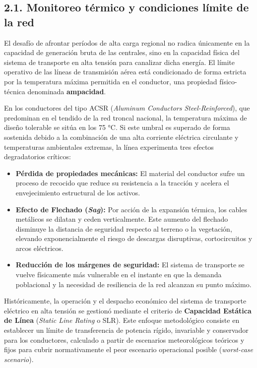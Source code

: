 \hypertarget{monitoreo-tuxe9rmico-y-condiciones-luxedmite-de-la-red}{%
\subsection{2.1. Monitoreo térmico y condiciones límite de la red}\label{monitoreo-tuxe9rmico-y-condiciones-luxedmite-de-la-red}}

El desafío de afrontar períodos de alta carga regional no radica únicamente en la capacidad de generación bruta de las centrales, sino en la capacidad física del sistema de transporte en alta tensión para canalizar dicha energía. El límite operativo de las líneas de transmisión aérea está condicionado de forma estricta por la temperatura máxima permitida en el conductor, una propiedad físico-técnica denominada \textbf{ampacidad}.

En los conductores del tipo ACSR (\emph{Aluminum Conductors Steel-Reinforced}), que predominan en el tendido de la red troncal nacional, la temperatura máxima de diseño tolerable se sitúa en los 75 °C. Si este umbral es superado de forma sostenida debido a la combinación de una alta corriente eléctrica circulante y temperaturas ambientales extremas, la línea experimenta tres efectos degradatorios críticos:

\begin{itemize}
\item
  \textbf{Pérdida de propiedades mecánicas:} El material del conductor sufre un proceso de recocido que reduce su resistencia a la tracción y acelera el envejecimiento estructural de los activos.
\item
  \textbf{Efecto de Flechado (\emph{Sag}):} Por acción de la expansión térmica, los cables metálicos se dilatan y ceden verticalmente. Este aumento del flechado disminuye la distancia de seguridad respecto al terreno o la vegetación, elevando exponencialmente el riesgo de descargas disruptivas, cortocircuitos y arcos eléctricos.
\item
  \textbf{Reducción de los márgenes de seguridad:} El sistema de transporte se vuelve físicamente más vulnerable en el instante en que la demanda poblacional y la necesidad de resiliencia de la red alcanzan su punto máximo.
\end{itemize}

Históricamente, la operación y el despacho económico del sistema de transporte eléctrico en alta tensión se gestionó mediante el criterio de \textbf{Capacidad Estática de Línea} (\emph{Static Line Rating} o SLR). Este enfoque metodológico consiste en establecer un límite de transferencia de potencia rígido, invariable y conservador para los conductores, calculado a partir de escenarios meteorológicos teóricos y fijos para cubrir normativamente el peor escenario operacional posible (\emph{worst-case scenario}).

